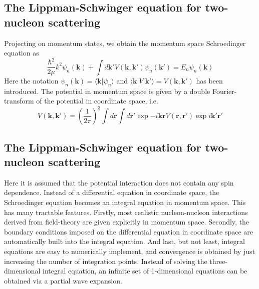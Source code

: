 \documentclass[%
twoside,                 %
final,                   %
10pt]{article}
\begin{document}
\subsection{The Lippman-Schwinger equation for two-nucleon scattering}
\begin{block}{}
Projecting  on momentum states, we obtain the momentum space Schroedinger equation as
\begin{equation}
\frac{\hbar^2}{2\mu}k^2\psi_n(\mathbf{k})+\int d\mathbf{k'}V(\mathbf{k}, \mathbf{k'}) \psi_n(\mathbf{k'})=E_n \psi_n(\mathbf{k})
\label{eq:momspace1}
\end{equation}
Here the notation $\psi_n(\mathbf{k}) =\langle\mathbf{k}\vert\psi_n\rangle $ and 
$\langle\mathbf{k}\vert V\vert\mathbf{k}' \rangle =V(\mathbf{k}, \mathbf{k'})$ has been introduced.
The potential in momentum space is given by a double Fourier-transform 
of the potential in coordinate space, i.e.
\[ 
V(\mathbf{k},\mathbf{k'}) = \left( \frac{1}{2\pi}\right)^3\int d\mathbf{r}\int d\mathbf{r}'\exp{-i\mathbf{kr}}V(\mathbf{r},\mathbf{r}')\exp{i\mathbf{k}'\mathbf{r}'}  
\]
\end{block}

\subsection{The Lippman-Schwinger equation for two-nucleon scattering}
\begin{block}{}
Here it is assumed that the potential interaction does not contain any spin dependence. 
Instead of a differential equation in coordinate space, the Schroedinger
equation becomes an integral equation in momentum space. This has 
many tractable features. Firstly, most realistic 
nucleon-nucleon interactions derived from field-theory are given 
explicitly in momentum space. Secondly, the boundary conditions imposed
on the differential equation in coordinate space are automatically built into the
integral equation. And last, but not least, integral equations are easy to numerically 
implement, and convergence is obtained by just increasing the number of integration
points.
Instead of solving the three-dimensional integral equation, an 
infinite set of 1-dimensional equations can be obtained via a  partial wave
expansion. 
\end{block}

\end{document}
